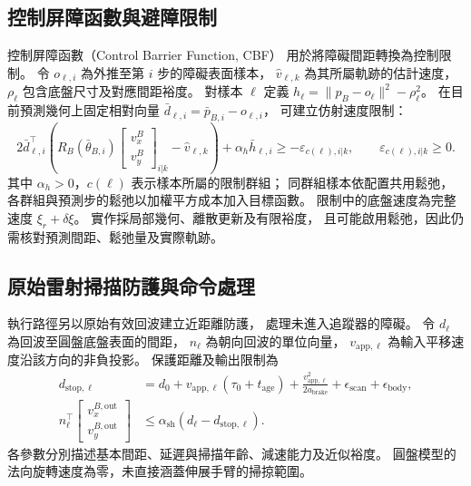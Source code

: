 \subsection{控制屏障函數與避障限制}
\label{subsec:cbf_obstacle_constraints}

控制屏障函數（Control Barrier Function, CBF）
用於將障礙間距轉換為控制限制\cite{ames2019cbf}。
令 $o_{\ell,i}$ 為外推至第 $i$ 步的障礙表面樣本，
$\hat v_{\ell,k}$ 為其所屬軌跡的估計速度，
$\rho_\ell$ 包含底盤尺寸及對應間距裕度。
對樣本 $\ell$ 定義
$h_\ell=\|p_B-o_\ell\|^2-\rho_\ell^2$。
在目前預測幾何上固定相對向量
$\bar d_{\ell,i}=\bar p_{B,i}-o_{\ell,i}$，
可建立仿射速度限制：
\begin{equation}
    2\bar d_{\ell,i}^{\top}
    \left(R_B(\bar\theta_{B,i})
    \begin{bmatrix}v_x^B\\v_y^B\end{bmatrix}_{i|k}
    -\hat v_{\ell,k}\right)
    +\alpha_h\bar h_{\ell,i}
    \geq-\varepsilon_{c(\ell),i|k},
    \qquad \varepsilon_{c(\ell),i|k}\geq0 .
    \label{eq:ch3_cbf_affine_constraint}
\end{equation}
其中 $\alpha_h>0$，$c(\ell)$ 表示樣本所屬的限制群組；
同群組樣本依配置共用鬆弛，
各群組與預測步的鬆弛以加權平方成本加入目標函數。
限制中的底盤速度為完整速度 $\xi_r+\delta\xi$。
實作採局部幾何、離散更新及有限裕度，
且可能啟用鬆弛，因此仍需核對預測間距、鬆弛量及實際軌跡。

\subsection{原始雷射掃描防護與命令處理}
\label{subsec:raw_scan_command_protection}

執行路徑另以原始有效回波建立近距離防護，
處理未進入追蹤器的障礙。
令 $d_\ell$ 為回波至圓盤底盤表面的間距，
$n_\ell$ 為朝向回波的單位向量，
$v_{\mathrm{app},\ell}$ 為輸入平移速度沿該方向的非負投影。
保護距離及輸出限制為
\begin{equation}
    \begin{aligned}
        d_{\mathrm{stop},\ell}
        &=d_0+v_{\mathrm{app},\ell}(\tau_0+t_{\mathrm{age}})
          +\frac{v_{\mathrm{app},\ell}^2}{2a_{\mathrm{brake}}}
          +\epsilon_{\mathrm{scan}}+\epsilon_{\mathrm{body}},\\
        n_\ell^\top
        \begin{bmatrix}v_x^{B,\mathrm{out}}\\v_y^{B,\mathrm{out}}\end{bmatrix}
        &\leq\alpha_{\mathrm{sh}}(d_\ell-d_{\mathrm{stop},\ell}).
    \end{aligned}
    \label{eq:ch3_scan_stopping_distance}
\end{equation}
各參數分別描述基本間距、延遲與掃描年齡、減速能力及近似裕度。
圓盤模型的法向旋轉速度為零，未直接涵蓋伸展手臂的掃掠範圍。

